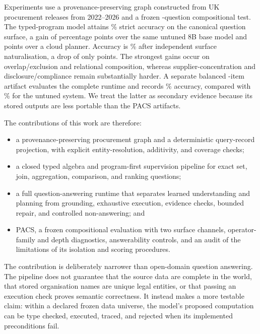 Experiments use a provenance-preserving graph constructed from UK procurement releases from
2022--2026 and a frozen \PacsN{}-question compositional test.  The typed-program model attains
\PacsOursA\% strict accuracy on the canonical question surface, a gain of \PacsGainBase{}
percentage points over the same untuned 8B base model and \PacsGainTeacher{} points over a cloud
planner.  Accuracy is \PacsOursB\% after independent surface naturalisation, a drop of only
\PacsSurfaceDrop{} points.  The strongest gains occur on overlap/exclusion and relational
composition, whereas supplier-concentration and disclosure/compliance remain substantially
harder.  A separate balanced \RuntimeN{}-item artifact evaluates the complete runtime and records
\RuntimeOurs\% accuracy, compared with \RuntimeBase\% for the untuned system.  We treat the
latter as secondary evidence because its stored outputs are less portable than the PACS
artifacts.

The contributions of this work are therefore:
\begin{itemize}
  \item a provenance-preserving procurement graph and a deterministic query-record projection,
  with explicit entity-resolution, additivity, and coverage checks;
  \item a closed typed algebra and program-first supervision pipeline for exact set, join,
  aggregation, comparison, and ranking questions;
  \item a full question-answering runtime that separates learned understanding and planning
  from grounding, exhaustive execution, evidence checks, bounded repair, and controlled
  non-answering; and
  \item PACS, a frozen compositional evaluation with two surface channels, operator-family and
  depth diagnostics, answerability controls, and an audit of the limitations of its isolation
  and scoring procedures.
\end{itemize}

The contribution is deliberately narrower than open-domain question answering.  The pipeline
does not guarantee that the source data are complete in the world, that stored organisation
names are unique legal entities, or that passing an execution check proves semantic correctness.
It instead makes a more testable claim: within a declared frozen data universe, the model's
proposed computation can be type checked, executed, traced, and rejected when its implemented
preconditions fail.
